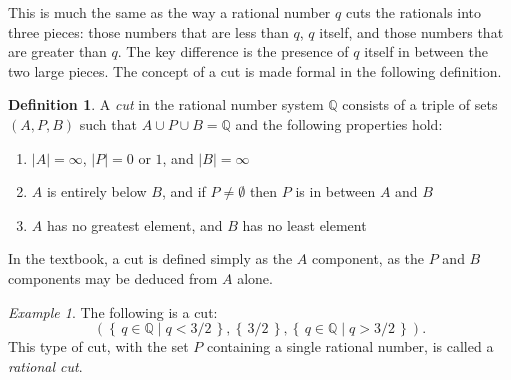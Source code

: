 \documentclass[11pt,oneside]{amsbook}
\newcommand{\set}[1]{\left\{\,#1\,\right\}}
\newcommand{\Q}{\mathbb Q}
\theoremstyle{definition}
\theoremstyle{plain}
\theoremstyle{definition}
\newtheorem{definition}[theorem]{Definition}
\theoremstyle{remark}
\newtheorem{example}[theorem]{Example}
\numberwithin{equation}{section}
\numberwithin{figure}{section}
\begin{document}
This is much the same as the way a rational number $q$ cuts the rationals into three pieces: those numbers that are less than $q$, $q$ itself, and those numbers that are greater than $q$. The key difference is the presence of $q$ itself in between the two large pieces. The concept of a cut is made formal in the following definition.

\begin{definition}
  A \emph{cut} in the rational number system $\Q$ consists of a triple of sets $(A,P,B)$ such that $A\cup P\cup B=\Q$ and the following properties hold:
  \begin{enumerate}
    \item $|A|=\infty$, $|P|=0$ or $1$, and $|B|=\infty$
    \item $A$ is entirely below $B$, and if $P\neq\emptyset$ then $P$ is in between $A$ and $B$
    \item $A$ has no greatest element, and $B$ has no least element
  \end{enumerate}
\end{definition}

In the textbook, a cut is defined simply as the $A$ component, as the $P$ and $B$ components may be deduced from $A$ alone.

\begin{example}
  The following is a cut:
  \begin{equation}
    \label{eq:rationalcut}
    \left(\set{q\in\Q\mid q<3/2},\set{3/2},\set{q\in\Q\mid q>3/2}\right)\text{.}
  \end{equation}
  This type of cut, with the set $P$ containing a single rational number, is called a \emph{rational cut}.

  \begin{center}
  \end{center}
\end{example}
\end{document}
